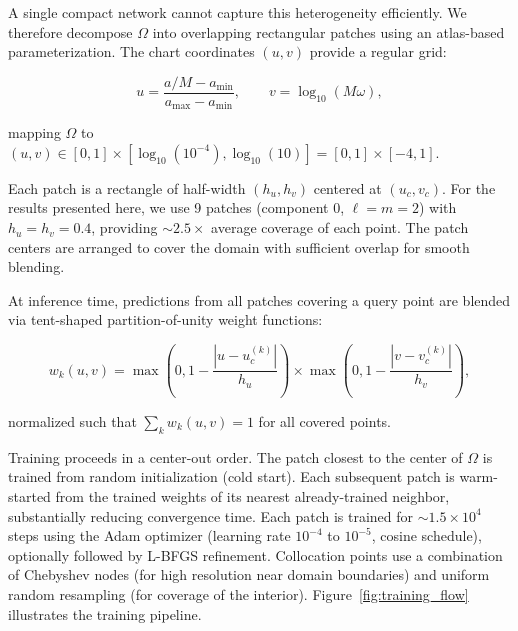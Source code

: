 \documentclass[aps,prd,twocolumn,superscriptaddress,nofootinbib]{revtex4-2}
\begin{document}
A single compact network cannot capture this heterogeneity efficiently.  We
therefore decompose $\Omega$ into overlapping rectangular patches using an
atlas-based parameterization.  The chart coordinates $(u,v)$ provide a
regular grid:

\begin{equation}
  u = \frac{a/M - a_{\min}}{a_{\max} - a_{\min}},\qquad
  v = \log_{10}(M\omega),
\end{equation}

mapping $\Omega$ to $(u,v) \in [0,1] \times [\log_{10}(10^{-4}),
\log_{10}(10)] = [0,1] \times [-4, 1]$.

Each patch is a rectangle of half-width $(h_u, h_v)$ centered at
$(u_c, v_c)$.  For the results presented here, we use 9 patches (component 0,
$\ell=m=2$) with $h_u = h_v = 0.4$, providing $\sim 2.5\times$ average
coverage of each point.  The patch centers are arranged to cover the domain
with sufficient overlap for smooth blending.

At inference time, predictions from all patches covering a query point are
blended via tent-shaped partition-of-unity weight functions:

\begin{equation}
  w_k(u,v) = \max\!\left(0, 1 - \frac{|u-u_c^{(k)}|}{h_u}\right)
    \times \max\!\left(0, 1 - \frac{|v-v_c^{(k)}|}{h_v}\right),
\end{equation}

normalized such that $\sum_k w_k(u,v) = 1$ for all covered points.

Training proceeds in a center-out order.  The patch closest to the center of
$\Omega$ is trained from random initialization (cold start).  Each subsequent
patch is warm-started from the trained weights of its nearest already-trained
neighbor, substantially reducing convergence time.  Each patch is trained for
$\sim 1.5 \times 10^{4}$ steps using the Adam optimizer (learning rate
$10^{-4}$ to $10^{-5}$, cosine schedule), optionally followed by L-BFGS
refinement.  Collocation points use a combination of Chebyshev nodes (for high
resolution near domain boundaries) and uniform random resampling (for coverage
of the interior).  Figure~\ref{fig:training_flow} illustrates the training
pipeline.
\end{document}

